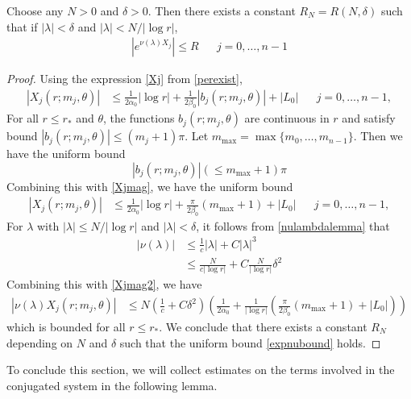 \documentclass[thesis.tex]{subfiles}
\begin{document}
\begin{lemma}\label{lemma:expnubound}
Choose any $N > 0$ and $\delta > 0$. Then there exists a constant $R_N = R(N, \delta)$ such that if $|\lambda| < \delta$ and $|\lambda| < N/|\log r|$,
\begin{align}\label{expnubound}
\left|e^{\nu(\lambda)X_j} \right| \leq R && j = 0, \dots, n-1
\end{align}
\begin{proof}
Using the expression \cref{Xj} from \cref{perexist},
\begin{align}\label{Xjmag}
|X_j(r; m_j, \theta)| &\leq \frac{1}{2 \alpha_0} |\log r| + \frac{1}{2\beta_0} |b_j(r; m_j, \theta)| + |L_0| && j = 0, \dots, n-1,
\end{align}
For all $r \leq r_*$ and $\theta$, the functions $b_j(r; m_j, \theta)$ are continuous in $r$ and satisfy bound $|b_j(r; m_j, \theta)| \leq (m_j + 1)\pi$. Let $m_{\max} = \max\{ m_0, \dots, m_{n-1}\}$. Then we have the uniform bound
\[
|b_j(r; m_j, \theta)| (\leq m_{\max} + 1)\pi
\]
Combining this with \cref{Xjmag}, we have the uniform bound
\begin{align}\label{Xjmag2}
\left|X_j(r; m_j, \theta)\right| &\leq \frac{1}{2 \alpha_0} |\log r| + \frac{\pi}{2\beta_0} (m_{\max} + 1) + |L_0| && j = 0, \dots, n-1,
\end{align}
For $\lambda$ with $|\lambda| \leq N/|\log r|$ and $|\lambda| < \delta$, it follows from \cref{nulambdalemma} that
\begin{align*}
|\nu(\lambda)| &\leq \frac{1}{c}|\lambda| + C |\lambda|^3 \\
&\leq \frac{N}{c |\log r|} + C \frac{N}{|\log r|}\delta^2
\end{align*}
Combining this with \cref{Xjmag2}, we have
\begin{align*}
|\nu(\lambda) X_j(r; m_j, \theta)| &\leq  N \left( \frac{1}{c} + C \delta^2 \right)\left( \frac{1}{2 \alpha_0} + \frac{1}{|\log r|} \left( \frac{\pi}{2\beta_0} (m_{\max} + 1) + |L_0| \right) \right)
\end{align*}
which is bounded for all $r \leq r_*$. We conclude that there exists a constant $R_N$ depending on $N$ and $\delta$ such that the uniform bound \cref{expnubound} holds.
\end{proof}
\end{lemma}

To conclude this section, we will collect estimates on the terms involved in the conjugated system in the following lemma.
\end{document}
